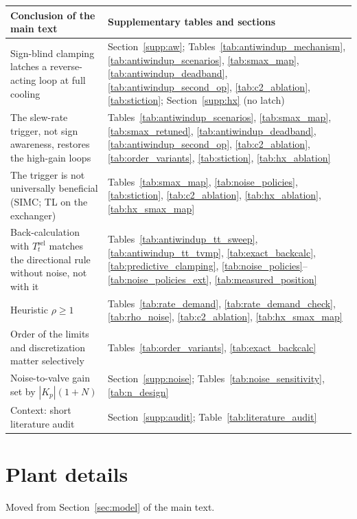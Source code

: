 \documentclass[11pt]{article}
\begin{document}
{\centering\footnotesize
\begin{tabular}{p{7.6cm}p{7.4cm}}
\toprule
Conclusion of the main text & Supplementary tables and sections \\
\midrule
Sign-blind clamping latches a reverse-acting loop at full cooling & Section~\ref{supp:aw}; Tables~\ref{tab:antiwindup_mechanism}, \ref{tab:antiwindup_scenarios}, \ref{tab:smax_map}, \ref{tab:antiwindup_deadband}, \ref{tab:antiwindup_second_op}, \ref{tab:c2_ablation}, \ref{tab:stiction}; Section~\ref{supp:hx} (no latch) \\
The slew-rate trigger, not sign awareness, restores the high-gain loops & Tables~\ref{tab:antiwindup_scenarios}, \ref{tab:smax_map}, \ref{tab:smax_retuned}, \ref{tab:antiwindup_deadband}, \ref{tab:antiwindup_second_op}, \ref{tab:c2_ablation}, \ref{tab:order_variants}, \ref{tab:stiction}, \ref{tab:hx_ablation} \\
The trigger is not universally beneficial (SIMC; TL on the exchanger) & Tables~\ref{tab:smax_map}, \ref{tab:noise_policies}, \ref{tab:stiction}, \ref{tab:c2_ablation}, \ref{tab:hx_ablation}, \ref{tab:hx_smax_map} \\
Back-calculation with $T_t^{\mathrm{sel}}$ matches the directional rule without noise, not with it & Tables~\ref{tab:antiwindup_tt_sweep}, \ref{tab:antiwindup_tt_tvmp}, \ref{tab:exact_backcalc}, \ref{tab:predictive_clamping}, \ref{tab:noise_policies}--\ref{tab:noise_policies_ext}, \ref{tab:measured_position} \\
Heuristic $\rho \ge 1$ & Tables~\ref{tab:rate_demand}, \ref{tab:rate_demand_check}, \ref{tab:rho_noise}, \ref{tab:c2_ablation}, \ref{tab:hx_smax_map} \\
Order of the limits and discretization matter selectively & Tables~\ref{tab:order_variants}, \ref{tab:exact_backcalc} \\
Noise-to-valve gain set by $|K_p|(1+N)$ & Section~\ref{supp:noise}; Tables~\ref{tab:noise_sensitivity}, \ref{tab:n_design} \\
Context: short literature audit & Section~\ref{supp:audit}; Table~\ref{tab:literature_audit} \\
\bottomrule
\end{tabular}\par}

\section{Plant details}\label{supp:plant}
Moved from Section~\ref{sec:model} of the main text.
\end{document}
